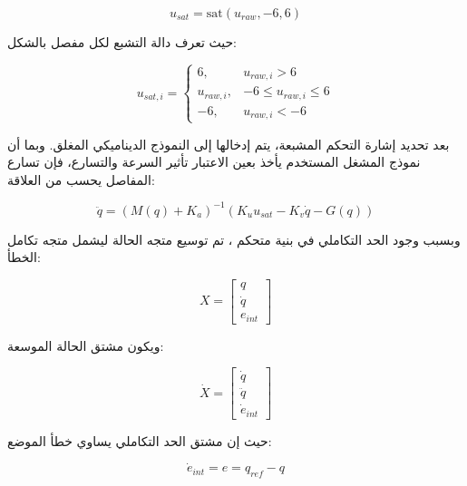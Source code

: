 \begin{equation}
u_{sat}
=
\mathrm{sat}
\left(
u_{raw},-6,6
\right)
\label{eq:pid_saturated_control_signal}
\end{equation}

حيث تعرف دالة التشبع لكل مفصل بالشكل:

\begin{equation}
u_{sat,i}
=
\begin{cases}
6, & u_{raw,i}>6\\
u_{raw,i}, & -6 \leq u_{raw,i} \leq 6\\
-6, & u_{raw,i}<-6
\end{cases}
\label{eq:pid_saturation_function}
\end{equation}

بعد تحديد إشارة التحكم المشبعة، يتم إدخالها إلى النموذج الديناميكي المغلق. وبما أن نموذج المشغل المستخدم يأخذ بعين الاعتبار تأثير السرعة والتسارع، فإن تسارع المفاصل يحسب من العلاقة:

\begin{equation}
\ddot{q}
=
\left(M(q)+K_a\right)^{-1}
\left(
K_u u_{sat}
-
K_v \dot{q}
-
G(q)
\right)
\label{eq:pid_closed_loop_acceleration}
\end{equation}

وبسبب وجود الحد التكاملي في بنية متحكم ، تم توسيع متجه الحالة ليشمل متجه تكامل الخطأ:

\begin{equation}
X=
\begin{bmatrix}
q\\
\dot{q}\\
e_{int}
\end{bmatrix}
\label{eq:pid_augmented_state_vector}
\end{equation}

ويكون مشتق الحالة الموسعة:

\begin{equation}
\dot{X}
=
\begin{bmatrix}
\dot{q}\\
\ddot{q}\\
\dot{e}_{int}
\end{bmatrix}
\label{eq:pid_augmented_state_derivative}
\end{equation}

حيث إن مشتق الحد التكاملي يساوي خطأ الموضع:

\begin{equation}
\dot{e}_{int}=e=q_{ref}-q
\label{eq:pid_integral_error_derivative}
\end{equation}

